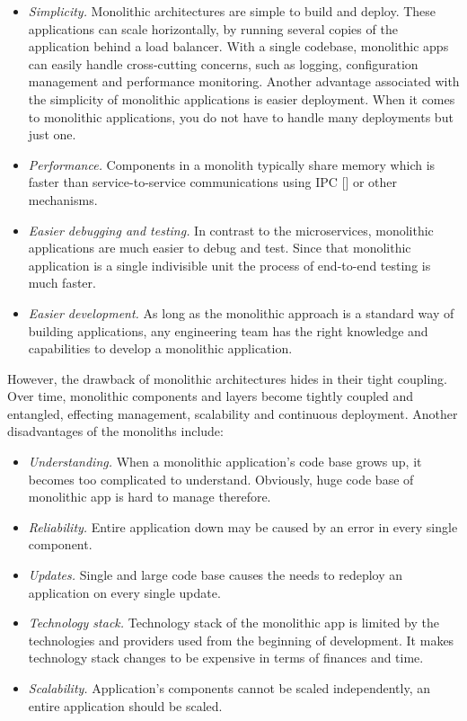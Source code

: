 \begin{itemize}
    \item \textit{Simplicity.} Monolithic architectures are simple to build and deploy.
    These applications can scale horizontally, by running several copies of the application behind a load balancer.
    With a single codebase, monolithic apps can easily handle cross-cutting concerns, such as logging,
    configuration management and performance monitoring.
    Another advantage associated with the simplicity of monolithic applications is easier deployment.
    When it comes to monolithic applications, you do not have to handle many deployments but just one.
    \item \textit{Performance.} Components in a monolith typically share memory which is faster than service-to-service
    communications using IPC [\cite{proctor1999linux}] or other mechanisms.
    \item \textit{Easier debugging and testing.}
    In contrast to the microservices, monolithic applications are much easier to debug and test.
    Since that monolithic application is a single indivisible unit the process of end-to-end testing is much faster.
    \item \textit{Easier development.} As long as the monolithic approach is a standard way of building applications,
    any engineering team has the right knowledge and capabilities to develop a monolithic application.
\end{itemize}

However, the drawback of monolithic architectures hides in their tight coupling.
Over time, monolithic components and layers become tightly coupled and entangled, effecting management, scalability
and continuous deployment.
Another disadvantages of the monoliths include:
\begin{itemize}
    \item \textit{Understanding.} When a monolithic application's code base grows up, it becomes too complicated to understand.
    Obviously, huge code base of monolithic app is hard to manage therefore.
    \item \textit{Reliability.} Entire application down may be caused by an error in every single component.
    \item \textit{Updates.} Single and large code base causes the needs to redeploy an application on every single update.
    \item \textit{Technology stack.} Technology stack of the monolithic app is limited by the technologies and providers
    used from the beginning of development.
    It makes technology stack changes to be expensive in terms of finances and time.
    \item \textit{Scalability.} Application's components cannot be scaled independently, an entire application should be scaled.
\end{itemize}

